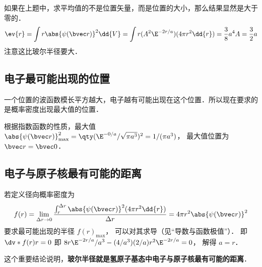 如果在上题中，求平均值的不是位置矢量，而是位置的大小，那么结果显然是大于零的．
\begin{equation}
\ev{r} = \int r \abs{\psi (\bvec r)}^2 \dd{V} = \int r (A^2 \E^{-2r/a})(4\pi r^2 \dd{r})= \frac{3}{8} a^4 A = \frac{3}{2}a
\end{equation}
注意这比玻尔半径要大．

\subsection{电子最可能出现的位置}

 一个位置的波函数模长平方越大，电子越有可能出现在这个位置．所以现在要求的是概率密度出现最大值的位置．
 
根据指数函数的性质，最大值 $\abs{\psi (\bvec r)}_{\max}^2 = \qty( \E^{-0/a}/\sqrt{\pi a^3})^2 = 1/(\pi a^3)$， 最大值位置为 $\bvec r = \bvec 0$．

\subsection{电子与原子核最有可能的距离}
若定义径向概率密度为
\begin{equation}
f(r) = \lim_{\Delta r \to 0} \frac{\int_r^{\Delta r} {\abs{\psi (\bvec r)}}^2 (4\pi r^2 \dd{r}) }{\Delta r} = 4\pi r^2 \abs{\psi(\bvec r)}^2
\end{equation}
要求最可能出现的半径 $f(r)_{\max}$， 可以对其求导（见“导数与函数极值”）． 即 $\dv*{f(r)}{r} = 0$ 即 $8 r \E^{-2r/a}/a^3 - (4/a^3)(2/a)r^2 \E^{-2r/a} = 0$， 解得 $a = r$． 
 
这个重要结论说明，\textbf{玻尔半径就是氢原子基态中电子与原子核最有可能的距离}．

